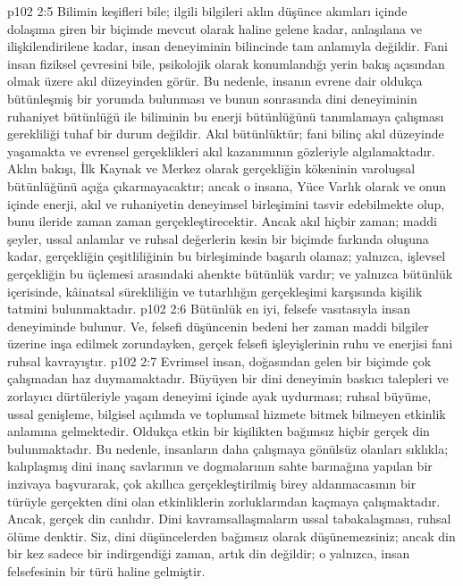 \vs p102 2:5 Bilimin keşifleri bile; ilgili bilgileri aklın düşünce akımları içinde dolaşıma giren bir biçimde mevcut olarak  haline gelene kadar, anlaşılana ve ilişkilendirilene kadar, insan deneyiminin bilincinde tam anlamıyla  değildir. Fani insan fiziksel çevresini bile, psikolojik olarak konumlandığı yerin bakış açısından olmak üzere akıl düzeyinden görür. Bu nedenle, insanın evrene dair oldukça bütünleşmiş bir yorumda bulunması ve bunun sonrasında dini deneyiminin ruhaniyet bütünlüğü ile biliminin bu enerji bütünlüğünü tanımlamaya çalışması gerekliliği tuhaf bir durum değildir. Akıl bütünlüktür; fani bilinç akıl düzeyinde yaşamakta ve evrensel gerçeklikleri akıl kazanımının gözleriyle algılamaktadır. Aklın bakışı, İlk Kaynak ve Merkez olarak gerçekliğin kökeninin varoluşsal bütünlüğünü açığa çıkarmayacaktır; ancak o insana, Yüce Varlık olarak ve onun içinde enerji, akıl ve ruhaniyetin deneyimsel birleşimini tasvir edebilmekte olup, bunu ileride zaman zaman gerçekleştirecektir. Ancak akıl hiçbir zaman; maddi şeyler, ussal anlamlar ve ruhsal değerlerin kesin bir biçimde farkında oluşuna kadar, gerçekliğin çeşitliliğinin bu birleşiminde başarılı olamaz; yalnızca, işlevsel gerçekliğin bu üçlemesi arasındaki ahenkte bütünlük vardır; ve yalnızca bütünlük içerisinde, kâinatsal sürekliliğin ve tutarlılığın gerçekleşimi karşısında kişilik tatmini bulunmaktadır.
\vs p102 2:6 Bütünlük en iyi, felsefe vasıtasıyla insan deneyiminde bulunur. Ve, felsefi düşüncenin bedeni her zaman maddi bilgiler üzerine inşa edilmek zorundayken, gerçek felsefi işleyişlerinin ruhu ve enerjisi fani ruhsal kavrayıştır.
\vs p102 2:7 Evrimsel insan, doğasından gelen bir biçimde çok çalışmadan haz duymamaktadır. Büyüyen bir dini deneyimin baskıcı talepleri ve zorlayıcı dürtüleriyle yaşam deneyimi içinde ayak uydurması; ruhsal büyüme, ussal genişleme, bilgisel açılımda ve toplumsal hizmete bitmek bilmeyen etkinlik anlamına gelmektedir. Oldukça etkin bir kişilikten bağımsız hiçbir gerçek din bulunmaktadır. Bu nedenle, insanların daha çalışmaya gönülsüz olanları sıklıkla; kalıplaşmış dini inanç savlarının ve dogmalarının sahte barınağına yapılan bir inzivaya başvurarak, çok akıllıca gerçekleştirilmiş birey aldanmacasının bir türüyle gerçekten dini olan etkinliklerin zorluklarından kaçmaya çalışmaktadır. Ancak, gerçek din canlıdır. Dini kavramsallaşmaların ussal tabakalaşması, ruhsal ölüme denktir. Siz, dini düşüncelerden bağımsız olarak düşünemezsiniz; ancak din bir kez sadece bir  indirgendiği zaman, artık din değildir; o yalnızca, insan felsefesinin bir türü haline gelmiştir.
